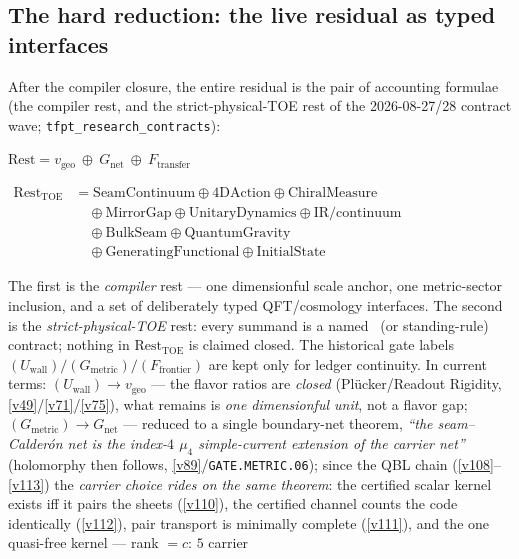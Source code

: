 \subsection*{The hard reduction: the live residual as typed interfaces}
\noindent After the compiler closure, the entire residual is the pair of accounting formulae
(the compiler rest, and the strict-physical-TOE rest of the 2026-08-27/28 contract wave;
\texttt{tfpt\_research\_contracts}):
\begin{keyeq}
$\displaystyle \text{Rest}=v_{\mathrm{geo}}\ \oplus\ G_{\mathrm{net}}\ \oplus\ F_{\mathrm{transfer}}$
\end{keyeq}
\begin{keyeq}
$\displaystyle \begin{aligned}
\text{Rest}_{\mathrm{TOE}}&=\mathrm{SeamContinuum}\oplus\mathrm{4DAction}\oplus\mathrm{ChiralMeasure}\\
&\quad\oplus\mathrm{MirrorGap}\oplus\mathrm{UnitaryDynamics}\oplus\mathrm{IR/continuum}\\
&\quad\oplus\mathrm{BulkSeam}\oplus\mathrm{QuantumGravity}\\
&\quad\oplus\mathrm{GeneratingFunctional}\oplus\mathrm{InitialState}
\end{aligned}$
\end{keyeq}
The first is the \emph{compiler} rest --- one dimensionful scale anchor, one metric-sector inclusion, and a set of deliberately typed
QFT/cosmology interfaces.  The second is the \emph{strict-physical-TOE} rest: every summand is a named
\mO\ (or standing-rule) contract; nothing in $\text{Rest}_{\mathrm{TOE}}$ is claimed closed.
The historical gate labels $(U_{\mathrm{wall}})/(G_{\mathrm{metric}})/(F_{\mathrm{frontier}})$ are
kept only for ledger continuity. In current terms: $(U_{\mathrm{wall}})\to v_{\mathrm{geo}}$ --- the flavor ratios are
\emph{closed} (Pl\"ucker/Readout Rigidity, \vref{v49}/\vref{v71}/\vref{v75}), what remains is \emph{one dimensionful unit}, not a
flavor gap; $(G_{\mathrm{metric}})\to G_{\mathrm{net}}$ --- reduced to a single boundary-net theorem,
\emph{``the seam--Calder\'on net is the index-$4$ $\mu_4$ simple-current extension of the carrier net''}
(holomorphy then follows, \vref{v89}/\texttt{GATE.METRIC.06}); since the QBL chain
(\vref{v108}--\vref{v113}) the \emph{carrier choice rides on the same theorem}: the certified scalar kernel exists
iff it pairs the sheets (\vref{v110}), the certified channel counts the code identically (\vref{v112}), pair
transport is minimally complete (\vref{v111}), and the one quasi-free kernel --- rank $=c$: $5$ carrier
